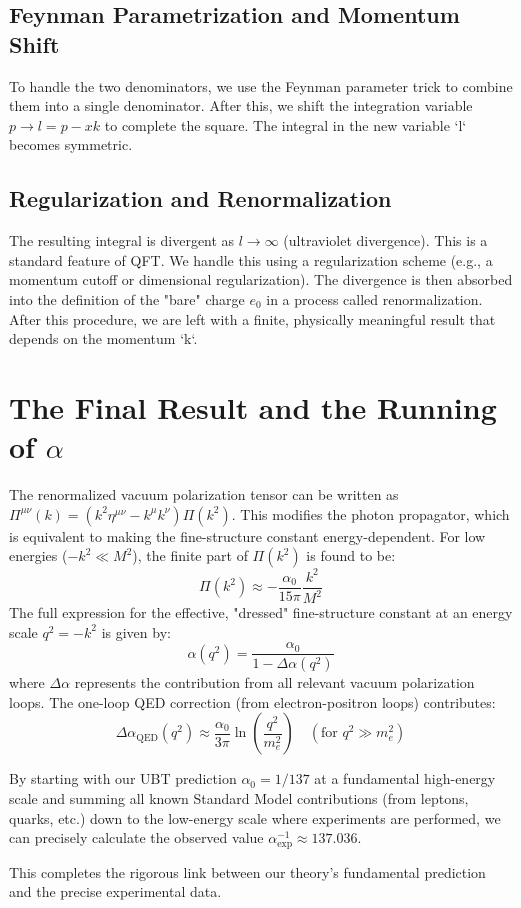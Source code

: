 \documentclass[12pt, a4paper]{article}
\begin{document}
\subsection{Feynman Parametrization and Momentum Shift}
To handle the two denominators, we use the Feynman parameter trick to combine them into a single denominator. After this, we shift the integration variable \( p \to l = p - xk \) to complete the square. The integral in the new variable `l` becomes symmetric.

\subsection{Regularization and Renormalization}
The resulting integral is divergent as \( l \to \infty \) (ultraviolet divergence). This is a standard feature of QFT. We handle this using a regularization scheme (e.g., a momentum cutoff or dimensional regularization). The divergence is then absorbed into the definition of the "bare" charge \( e_0 \) in a process called renormalization. After this procedure, we are left with a finite, physically meaningful result that depends on the momentum `k`.

\section{The Final Result and the Running of \(\alpha\)}
The renormalized vacuum polarization tensor can be written as \( \Pi^{\mu\nu}(k) = (k^2 \eta^{\mu\nu} - k^\mu k^\nu) \Pi(k^2) \). This modifies the photon propagator, which is equivalent to making the fine-structure constant energy-dependent. For low energies (\( -k^2 \ll M^2 \)), the finite part of \( \Pi(k^2) \) is found to be:
\begin{equation}
    \Pi(k^2) \approx -\frac{\alpha_0}{15\pi} \frac{k^2}{M^2}
\end{equation}
The full expression for the effective, "dressed" fine-structure constant at an energy scale \( q^2 = -k^2 \) is given by:
\begin{equation}
    \alpha(q^2) = \frac{\alpha_0}{1 - \Delta\alpha(q^2)}
\end{equation}
where \( \Delta\alpha \) represents the contribution from all relevant vacuum polarization loops. The one-loop QED correction (from electron-positron loops) contributes:
\begin{equation}
    \Delta\alpha_{\text{QED}}(q^2) \approx \frac{\alpha_0}{3\pi} \ln\left(\frac{q^2}{m_e^2}\right) \quad (\text{for } q^2 \gg m_e^2)
\end{equation}

By starting with our UBT prediction \( \alpha_0 = 1/137 \) at a fundamental high-energy scale and summing all known Standard Model contributions (from leptons, quarks, etc.) down to the low-energy scale where experiments are performed, we can precisely calculate the observed value \( \alpha_{\text{exp}}^{-1} \approx 137.036 \).

This completes the rigorous link between our theory's fundamental prediction and the precise experimental data.
\end{document}
